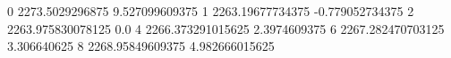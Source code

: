 0 2273.5029296875 9.527099609375
1 2263.19677734375 -0.779052734375
2 2263.975830078125 0.0
4 2266.373291015625 2.3974609375
6 2267.282470703125 3.306640625
8 2268.95849609375 4.982666015625

